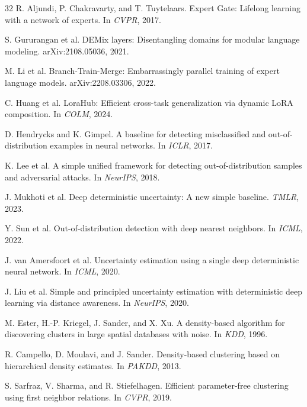 \documentclass[10pt]{article}
\begin{document}
\begin{thebibliography}{32}
R. Aljundi, P. Chakravarty, and T. Tuytelaars.
\newblock Expert Gate: Lifelong learning with a network of experts.
\newblock In \emph{CVPR}, 2017.

S. Gururangan et al.
\newblock DEMix layers: Disentangling domains for modular language modeling.
\newblock arXiv:2108.05036, 2021.

M. Li et al.
\newblock Branch-Train-Merge: Embarrassingly parallel training of expert
language models.
\newblock arXiv:2208.03306, 2022.

C. Huang et al.
\newblock LoraHub: Efficient cross-task generalization via dynamic LoRA
composition.
\newblock In \emph{COLM}, 2024.

D. Hendrycks and K. Gimpel.
\newblock A baseline for detecting misclassified and out-of-distribution
examples in neural networks.
\newblock In \emph{ICLR}, 2017.

K. Lee et al.
\newblock A simple unified framework for detecting out-of-distribution samples
and adversarial attacks.
\newblock In \emph{NeurIPS}, 2018.

J. Mukhoti et al.
\newblock Deep deterministic uncertainty: A new simple baseline.
\newblock \emph{TMLR}, 2023.

Y. Sun et al.
\newblock Out-of-distribution detection with deep nearest neighbors.
\newblock In \emph{ICML}, 2022.

J. van Amersfoort et al.
\newblock Uncertainty estimation using a single deep deterministic neural
network.
\newblock In \emph{ICML}, 2020.

J. Liu et al.
\newblock Simple and principled uncertainty estimation with deterministic deep
learning via distance awareness.
\newblock In \emph{NeurIPS}, 2020.

M. Ester, H.-P. Kriegel, J. Sander, and X. Xu.
\newblock A density-based algorithm for discovering clusters in large spatial
databases with noise.
\newblock In \emph{KDD}, 1996.

R. Campello, D. Moulavi, and J. Sander.
\newblock Density-based clustering based on hierarchical density estimates.
\newblock In \emph{PAKDD}, 2013.

S. Sarfraz, V. Sharma, and R. Stiefelhagen.
\newblock Efficient parameter-free clustering using first neighbor relations.
\newblock In \emph{CVPR}, 2019.


\end{thebibliography}
\end{document}
